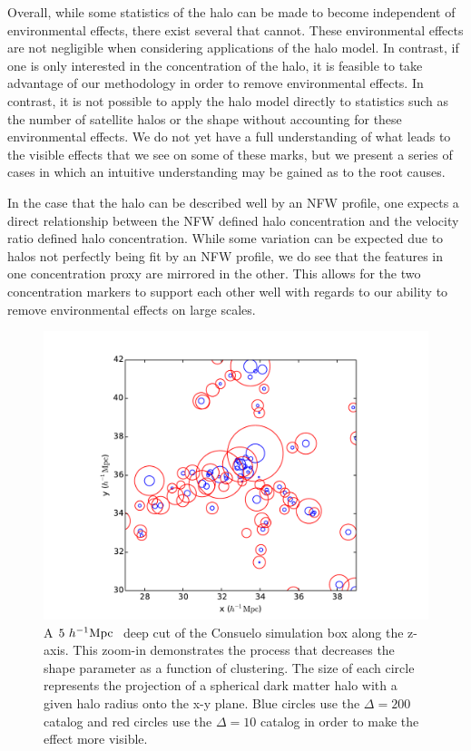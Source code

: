 \documentclass[usenatbib,usegraphicx,letterpaper]{mn2e}
\begin{document}
Overall, while some statistics of the halo can be made to become independent of environmental effects, there exist several that cannot. These environmental effects are not negligible when considering applications of the halo model. In contrast, if one is only interested in the concentration of the halo, it is feasible to take advantage of our methodology in order to remove environmental effects. In contrast, it is not possible to apply the halo model directly to statistics such as the number of satellite halos or the shape without accounting for these environmental effects. We do not yet have a full understanding of what leads to the visible effects that we see on some of these marks, but we present a series of cases in which an intuitive understanding may be gained as to the root causes.

In the case that the halo can be described well by an NFW profile, one expects a direct relationship between the NFW defined halo concentration and the velocity ratio defined halo concentration. While some variation can be expected due to halos not perfectly being fit by an NFW profile, we do see that the features in one concentration proxy are mirrored in the other. This allows for the two concentration markers to support each other well with regards to our ability to remove environmental effects on large scales.

\begin{figure}
	\centering
	\includegraphics[width=1\textwidth]{plotcircles.pdf}
	\caption{A $5 \ h^{-1}\mathrm{Mpc}~$ deep cut of the Consuelo simulation box along the z-axis. This zoom-in demonstrates the process that decreases the shape parameter as a function of clustering. The size of each circle represents the projection of a spherical dark matter halo with a given halo radius onto the x-y plane. Blue circles use the $\Delta = 200$ catalog and red circles use the $\Delta = 10$ catalog in order to make the effect more visible.}
\end{figure}
\end{document}
